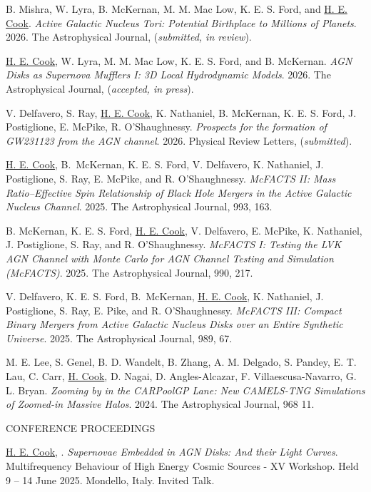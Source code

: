 \hangindent=0.5in \noindent B. Mishra, W. Lyra, B. McKernan, M. M. Mac Low, K. E. S. Ford, and \underline{H. E. Cook}. \textit{Active Galactic Nucleus Tori: Potential Birthplace to Millions of Planets}. 2026. The Astrophysical Journal, (\textit{submitted, in review}).

\hangindent=0.5in \noindent \underline{H. E. Cook}, W. Lyra, M. M. Mac Low, K. E. S. Ford, and B. McKernan. \textit{AGN Disks as Supernova Mufflers I: 3D Local Hydrodynamic Models}. 2026. The Astrophysical Journal, (\textit{accepted, in press}).

\hangindent=0.5in \noindent V. Delfavero, S. Ray, \underline{H. E. Cook}, K. Nathaniel, B. McKernan, K. E. S. Ford, J. Postiglione, E. McPike, R. O'Shaughnessy. \textit{Prospects for the formation of GW231123 from the AGN channel}. 2026. Physical Review Letters, (\textit{submitted}).

\hangindent=0.5in \noindent \underline{H. E. Cook}, B.~McKernan, K. E. S. Ford, V. Delfavero, K. Nathaniel, J. Postiglione, S. Ray, E. McPike, and R. O'Shaughnessy. \textit{McFACTS II: Mass Ratio--Effective Spin Relationship of Black Hole Mergers in the Active Galactic Nucleus Channel}. 2025. The Astrophysical Journal, 993, 163.

\hangindent=0.5in \noindent  B. McKernan, K. E. S. Ford, \underline{H. E. Cook}, V. Delfavero, E. McPike, K. Nathaniel, J. Postiglione, S. Ray, and R. O'Shaughnessy. \textit{McFACTS I: Testing the LVK AGN Channel with Monte Carlo for AGN Channel Testing and Simulation (McFACTS)}. 2025. The Astrophysical Journal, 990, 217.

\hangindent=0.5in \noindent V. Delfavero, K. E. S. Ford, B.~McKernan, \underline{H. E. Cook}, K. Nathaniel, J. Postiglione, S. Ray, E. Pike, and R. O'Shaughnessy. \textit{McFACTS III: Compact Binary Mergers from Active Galactic Nucleus Disks over an Entire Synthetic Universe}. 2025. The Astrophysical Journal, 989, 67.

\hangindent=0.5in \noindent M. E. Lee, S. Genel, B. D. Wandelt, B. Zhang, A. M. Delgado, S. Pandey, E. T. Lau, C. Carr, \underline{H. Cook}, D. Nagai, D. Angles-Alcazar, F. Villaescusa-Navarro, G. L. Bryan. \textit{Zooming by in the CARPoolGP Lane: New CAMELS-TNG Simulations of Zoomed-in Massive Halos}. 2024. The Astrophysical Journal, 968 11.

\begin{center}
CONFERENCE PROCEEDINGS
\end{center}

\hangindent=0.5in \noindent \underline{H. E. Cook}, . \textit{Supernovae Embedded in AGN Disks: And their Light Curves}. Multifrequency Behaviour of High Energy Cosmic Sources - XV Workshop. Held 9 -- 14 June 2025. Mondello, Italy. Invited Talk.

